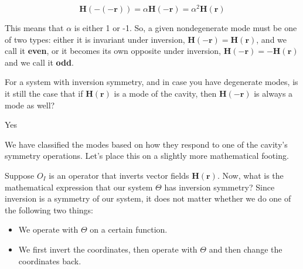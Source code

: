 \begin{equation}
{\mathbf H(-(-{\mathbf{r}}))} = \alpha {\mathbf H(-{\mathbf r})} = \alpha^2 {\mathbf H({\mathbf r})}
\end{equation} 

\noindent{}This means that $\alpha$ is either 1 or -1. So, a given nondegenerate mode must be one of two types: either it is invariant under inversion, ${\mathbf H(-{\mathbf r})} = {\mathbf H({\mathbf r})}$, and we call it \textbf{even}, or it becomes its own opposite under inversion, ${\mathbf H(-{\mathbf r})} = - {\mathbf H({\mathbf r})}$ and we call it \textbf{odd}.

\vspace{1cm}

\begin{exer}
  For a system with inversion symmetry, and in case you have degenerate modes, is it still the case that if ${\mathbf H({\mathbf r})}$ is a mode of the cavity, then ${\mathbf H(-{\mathbf r})}$ is always a mode as well?  

\begin{sol}
Yes
\end{sol}
\end{exer}

\pagebreak


We have classified the modes based on how they respond to one of the cavity's symmetry operations. Let's place this on a slightly more mathematical footing. 

Suppose $O_I$ is an operator that inverts vector fields ${\mathbf H({\mathbf r})}$. Now, what is the mathematical expression that our system $\Theta$ has inversion symmetry? Since inversion is a symmetry of our system, it does not matter whether we do one of the following two things:

\begin{itemize}
\item
 We operate with $\Theta$ on a certain function.
\item
\noindent{}We first invert the coordinates, then operate with $\Theta$ and then change the coordinates back.
\end{itemize}

